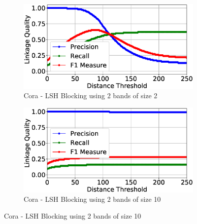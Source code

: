 \documentclass{llncs}
\begin{document}
\begin{figure}
\begin{subfigure}{.5\textwidth}
  \centering
\includegraphics[width=\textwidth]{figures/plotLQ-cora-lsh-2-2}
\caption{Cora - LSH Blocking using 2 bands of size 2}
\end{subfigure}%
\begin{subfigure}{.5\textwidth}
  \centering
\includegraphics[width=\textwidth]{figures/plotLQ-cora-lsh-2-10}
\caption{Cora - LSH Blocking using 2 bands of size 10}
\end{subfigure}


\end{figure}
\end{document}

